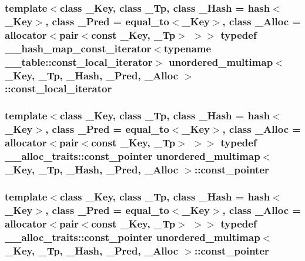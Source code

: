 \subsubsection[{const\+\_\+local\+\_\+iterator}]{\setlength{\rightskip}{0pt plus 5cm}template$<$class \+\_\+\+Key, class \+\_\+\+Tp, class \+\_\+\+Hash = hash$<$\+\_\+\+Key$>$, class \+\_\+\+Pred = equal\+\_\+to$<$\+\_\+\+Key$>$, class \+\_\+\+Alloc = allocator$<$pair$<$const \+\_\+\+Key, \+\_\+\+Tp$>$ $>$$>$ typedef {\bf \+\_\+\+\_\+hash\+\_\+map\+\_\+const\+\_\+iterator}$<$typename \+\_\+\+\_\+table\+::const\+\_\+local\+\_\+iterator$>$ {\bf unordered\+\_\+multimap}$<$ \+\_\+\+Key, \+\_\+\+Tp, \+\_\+\+Hash, \+\_\+\+Pred, \+\_\+\+Alloc $>$\+::{\bf const\+\_\+local\+\_\+iterator}}\label{classunordered__multimap_a4813834c894681f449b5afe718336482}
\hypertarget{classunordered__multimap_ac431051a949a339b15eb3c6f0ff5dccf}{}
\subsubsection[{const\+\_\+pointer}]{\setlength{\rightskip}{0pt plus 5cm}template$<$class \+\_\+\+Key, class \+\_\+\+Tp, class \+\_\+\+Hash = hash$<$\+\_\+\+Key$>$, class \+\_\+\+Pred = equal\+\_\+to$<$\+\_\+\+Key$>$, class \+\_\+\+Alloc = allocator$<$pair$<$const \+\_\+\+Key, \+\_\+\+Tp$>$ $>$$>$ typedef \+\_\+\+\_\+alloc\+\_\+traits\+::const\+\_\+pointer {\bf unordered\+\_\+multimap}$<$ \+\_\+\+Key, \+\_\+\+Tp, \+\_\+\+Hash, \+\_\+\+Pred, \+\_\+\+Alloc $>$\+::{\bf const\+\_\+pointer}}\label{classunordered__multimap_ac431051a949a339b15eb3c6f0ff5dccf}
\hypertarget{classunordered__multimap_ac431051a949a339b15eb3c6f0ff5dccf}{}
\subsubsection[{const\+\_\+pointer}]{\setlength{\rightskip}{0pt plus 5cm}template$<$class \+\_\+\+Key, class \+\_\+\+Tp, class \+\_\+\+Hash = hash$<$\+\_\+\+Key$>$, class \+\_\+\+Pred = equal\+\_\+to$<$\+\_\+\+Key$>$, class \+\_\+\+Alloc = allocator$<$pair$<$const \+\_\+\+Key, \+\_\+\+Tp$>$ $>$$>$ typedef \+\_\+\+\_\+alloc\+\_\+traits\+::const\+\_\+pointer {\bf unordered\+\_\+multimap}$<$ \+\_\+\+Key, \+\_\+\+Tp, \+\_\+\+Hash, \+\_\+\+Pred, \+\_\+\+Alloc $>$\+::{\bf const\+\_\+pointer}}\label{classunordered__multimap_ac431051a949a339b15eb3c6f0ff5dccf}
\hypertarget{classunordered__multimap_ab3aedd41dcc9c645d596c98ba3379826}{}
